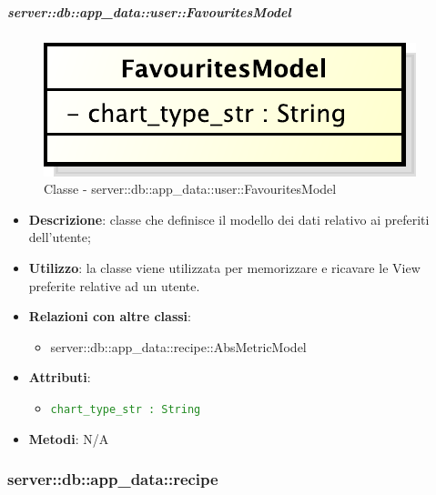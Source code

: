 		\subparagraph{server::db::app\_data::user::FavouritesModel} %
		\label{subp:server_db_app_data_user_favorites}
			\begin{figure}[htbp]
				\centering
				\centerline{\includegraphics[scale=0.75]{./images/server/classes/db/favourites_model.pdf}}
				\caption{Classe - server::db::app\_data::user::FavouritesModel}
			\end{figure}
			\begin{itemize}
				\item \textbf{Descrizione}: classe che definisce il modello dei dati relativo ai preferiti dell'utente;
				\item \textbf{Utilizzo}: la classe viene utilizzata per memorizzare e ricavare le View preferite relative ad un utente.
				\item \textbf{Relazioni con altre classi}:
					\begin{itemize}
						\item server::db::app\_data::recipe::AbsMetricModel
					\end{itemize}
				\item \textbf{Attributi}:
					\begin{itemize}
						\item \textcolor{forestgreen}{\texttt{chart\_type\_str : String}}
					\end{itemize}
				\item \textbf{Metodi}: N/A
			\end{itemize}


\subsubsection{server::db::app\_data::recipe} %
\label{ssub:bdsm_app_server_app_data_recipe}

